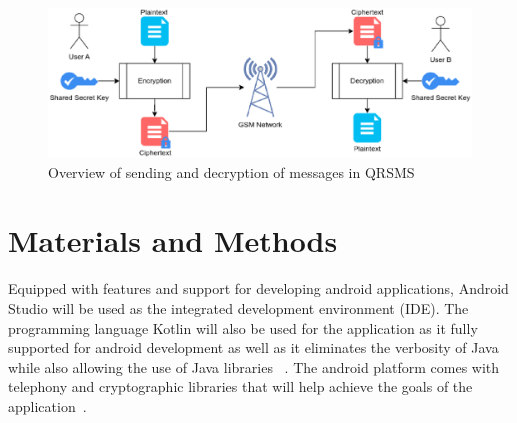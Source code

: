 \documentclass[journal]{./IEEE/IEEEtran}
\begin{document}
\begin{figure}
	\centering
	\includegraphics[width=6in]{images/encrypted_messaging.eps}
	\caption{Overview of sending and decryption of messages in
		QRSMS}
	\label{encrypted}
\end{figure}

\section{Materials and Methods}
Equipped with features and support for developing android applications,
Android Studio will be used as the integrated development environment (IDE).
The programming language Kotlin will also be used for the application as it
fully supported for android development as well as it eliminates the verbosity
of Java while also allowing the use of Java libraries
~\cite{Moskala_Wojda_2017}. The android platform comes with telephony and
cryptographic libraries that will help achieve the goals of the
application~\cite{android_pkg}.
\end{document}
